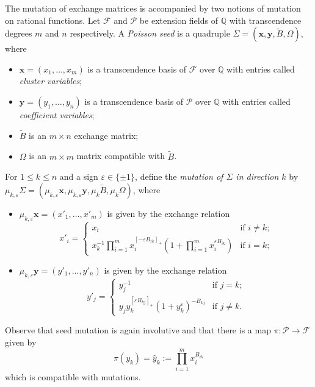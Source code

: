 \documentclass{amsart}
\newcommand{\bfx}{\mathbf{x}}
\newcommand{\bfy}{\mathbf{y}}
\newcommand{\cF}{\mathcal{F}}
\newcommand{\cP}{\mathcal{P}}
\newcommand{\QQ}{\mathbb{Q}}
\begin{document}
The mutation of exchange matrices is accompanied by two notions of mutation on rational functions.
Let $\cF$ and $\cP$ be extension fields of $\QQ$ with transcendence degrees $m$ and $n$ respectively.   
A \emph{Poisson seed} is a quadruple $\Sigma=(\bfx,\bfy,\tilde B,\Omega)$, where
\begin{itemize}
  \item $\bfx=(x_1,\ldots,x_m)$ is a transcendence basis of $\cF$ over $\QQ$ with entries called \emph{cluster variables};
  \item $\bfy=(y_1,\ldots,y_n)$ is a transcendence basis of $\cP$ over $\QQ$ with entries called \emph{coefficient variables};
  \item $\tilde B$ is an $m\times n$ exchange matrix;
  \item $\Omega$ is an $m\times m$ matrix compatible with $\tilde B$.
\end{itemize}
For $1\le k\le n$ and a sign $\varepsilon\in\{\pm1\}$, define the \emph{mutation of $\Sigma$ in direction $k$} by $\mu_{k,\varepsilon}\Sigma=(\mu_{k,\varepsilon}\bfx,\mu_{k,\varepsilon}\bfy,\mu_k\tilde B,\mu_k\Omega)$, where 
\begin{itemize}
  \item $\mu_{k,\varepsilon}\bfx=(x'_1,\ldots,x'_m)$ is given by the exchange relation
    \begin{equation}
      \label{eq:x exchange relation}
      x'_i=\begin{cases} x_i & \text{if $i\ne k$;}\\ x_k^{-1}\prod\limits_{i=1}^m x_i^{[-\varepsilon B_{ik}]_+}\left(1+\prod\limits_{i=1}^m x_i^{\varepsilon B_{ik}}\right) & \text{if $i=k$;}\end{cases}
    \end{equation}
  \item $\mu_{k,\varepsilon}\bfy=(y'_1,\ldots,y'_n)$ is given by the exchange relation 
    \begin{equation}
      \label{eq:y exchange relation}
      y'_j=\begin{cases} y_j^{-1} & \text{if $j=k$;}\\ y_jy_k^{[\varepsilon B_{kj}]_+}(1+y_k^\varepsilon)^{-B_{kj}} & \text{if $j\ne k$.}\end{cases}
    \end{equation}
\end{itemize}
Observe that seed mutation is again involutive and that there is a map $\pi:\cP\to\cF$ given by 
\begin{equation}
  \label{eq:A to X}
  \pi(y_k)=\hat y_k:=\prod\limits_{i=1}^m x_i^{B_{ik}}
\end{equation}
which is compatible with mutations.
\end{document}
